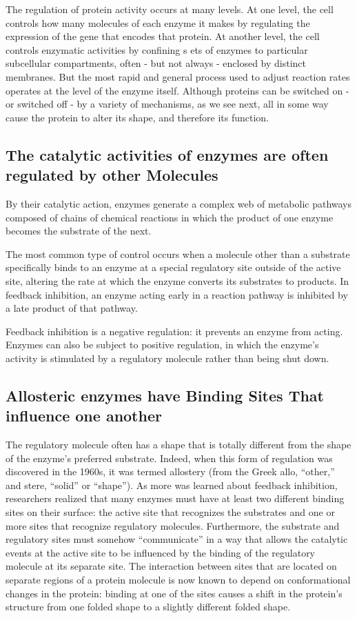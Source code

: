 The regulation of protein activity occurs at many levels. At one level, the
cell controls how many molecules of each enzyme it makes by regulating
the expression of the gene that encodes that protein.
At another level, the cell controls enzymatic activities by confining s
ets of enzymes to particular subcellular compartments, often - but
not always - enclosed by distinct membranes.
But the most rapid and general process used to adjust reaction
rates operates at the level of the enzyme itself. Although proteins can be
switched on - or switched off - by a variety of mechanisms, as we see
next, all in some way cause the protein to alter its shape, and therefore
its function.

\subsection{The catalytic activities of enzymes are often regulated by other Molecules}

By their catalytic action, enzymes generate a complex web of metabolic pathways
composed of chains of chemical reactions in which the product of
one enzyme becomes the substrate of the next.

The most common type of control occurs when a molecule other than a
substrate specifically binds to an enzyme at a special regulatory site outside
of the active site, altering the rate at which the enzyme converts its
substrates to products. In feedback inhibition, an enzyme acting early in
a reaction pathway is inhibited by a late product of that pathway.

Feedback inhibition is a negative regulation: it prevents an enzyme from
acting. Enzymes can also be subject to positive regulation, in which the
enzyme’s activity is stimulated by a regulatory molecule rather than being
shut down.

\subsection{Allosteric enzymes have Binding Sites That influence one another}

The regulatory molecule often has a shape that is totally
different from the shape of the enzyme’s preferred substrate. Indeed,
when this form of regulation was discovered in the 1960s, it was termed
allostery (from the Greek allo, “other,” and stere, “solid” or “shape”). As
more was learned about feedback inhibition, researchers realized that
many enzymes must have at least two different binding sites on their
surface: the active site that recognizes the substrates and one or more
sites that recognize regulatory molecules. Furthermore, the substrate and
regulatory sites must somehow “communicate” in a way that allows the
catalytic events at the active site to be influenced by the binding of the
regulatory molecule at its separate site.
The interaction between sites that are located on separate regions of a
protein molecule is now known to depend on conformational changes
in the protein: binding at one of the sites causes a shift in the protein’s
structure from one folded shape to a slightly different folded shape.

